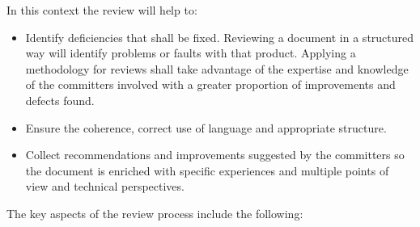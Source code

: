 \documentclass{template/openetcs_article}
\begin{document}
In this context the review will help to:
\begin{itemize}
\item Identify deficiencies that shall be fixed. Reviewing a document in a structured way will identify problems or faults with that product. Applying a methodology for reviews shall take advantage of the expertise and knowledge of the committers involved with a greater proportion of improvements and defects found.
\item Ensure the coherence, correct use of language and appropriate structure.
\item Collect recommendations and improvements suggested by the committers so the document is enriched with specific experiences and multiple points of view and technical perspectives.
\end{itemize}

The key aspects of the review process include the following:
\end{document}
